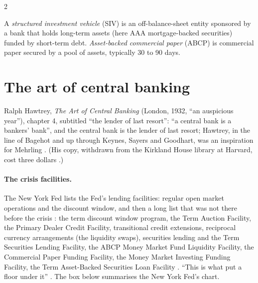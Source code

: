 \begin{paracol}{2}
\begin{definition}
A \emph{structured investment vehicle} (SIV) is an off-balance-sheet entity sponsored by a bank that holds long-term assets (here AAA mortgage-backed securities)
funded by short-term debt. \emph{Asset-backed commercial paper} (ABCP) is commercial paper secured by a pool of assets, typically 30 to 90 days.
\end{definition}

\section{The art of central banking}\label{sec:lr-art}

Ralph Hawtrey, \emph{The Art of Central Banking} (London, 1932, ``an auspicious year''), chapter 4, subtitled ``the lender of last resort'': ``a central bank is
a bankers' bank'', and the central bank is the lender of last resort; Hawtrey, in the line of Bagehot and up through Keynes, Sayers and Goodhart, was an
inspiration for Mehrling . (His copy, withdrawn from the Kirkland House library at Harvard, cost three dollars
.)

\paragraph{The crisis facilities.} The New York Fed lists the Fed's lending facilities: regular open market operations and the discount window, and then a long
list that was not there before the crisis : the term discount window program, the Term Auction Facility, the Primary Dealer Credit
Facility, transitional credit extensions, reciprocal currency arrangements (the liquidity swaps), securities lending and the Term Securities Lending Facility, the
ABCP Money Market Fund Liquidity Facility, the Commercial Paper Funding Facility, the Money Market Investing Funding Facility, the Term Asset-Backed
Securities Loan Facility . ``This is what put a floor under it'' . The box below summarises the New York Fed's chart.


\end{paracol}
